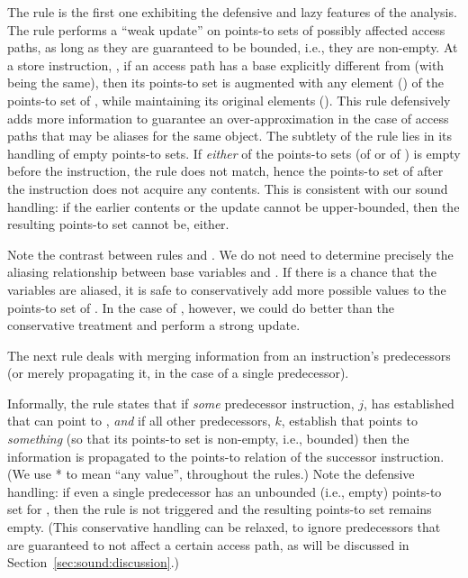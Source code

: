 The  rule is the first one exhibiting the defensive and lazy features of the analysis. The rule performs a ``weak update'' on points-to sets of possibly affected access paths, as long as they are guaranteed to be bounded, i.e., they are non-empty. At a store instruction, , if an access path  has a base explicitly different from  (with  being the same), then its points-to set is augmented with any element () of the points-to set of , while maintaining its original elements (). This rule defensively adds more information to guarantee an over-approximation in the case of access paths that may be aliases for the same object. The subtlety of the rule lies in its handling of empty points-to sets. If \emph{either} of the points-to sets (of  or of ) is empty before the instruction, the rule does not match, hence the points-to set of  after the instruction does not acquire any contents. This is consistent with our sound handling: if the earlier contents or the update cannot be upper-bounded, then the resulting points-to set cannot be, either.

Note the contrast between rules  and . We do not need to determine precisely the aliasing relationship between base variables  and . If there is a chance that the variables are aliased, it is safe to conservatively add more possible values to the points-to set of . In the case of , however, we could do better than the conservative treatment and perform a strong update.


The next rule deals with merging information from an instruction's predecessors (or merely propagating it, in the case of a single predecessor).

Informally, the rule states that if \emph{some} predecessor instruction, $j$, has established that  can point to , \emph{and} if all other predecessors, $k$, establish that  points to \emph{something} (so that its points-to set is non-empty, i.e., bounded) then the information is propagated to the points-to relation of the successor instruction. (We use * to mean ``any value'', throughout the rules.) Note the defensive handling: if even a single predecessor has an unbounded (i.e., empty) points-to set for , then the rule is not triggered and the resulting points-to set remains empty. (This conservative handling can be relaxed, to ignore predecessors that are guaranteed to not affect a certain access path, as will be discussed in Section~\ref{sec:sound:discussion}.)


